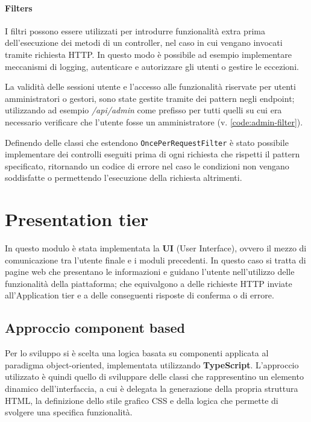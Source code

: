 

\paragraph{Filters}
I filtri possono essere utilizzati per introdurre funzionalità extra prima
dell’esecuzione dei metodi di un controller, nel caso in cui vengano invocati
tramite richiesta HTTP. In questo modo è possibile ad esempio implementare
meccanismi di logging, autenticare e autorizzare gli utenti o gestire le eccezioni. 

La validità delle sessioni utente e l'accesso alle funzionalità riservate per
utenti amministratori o gestori, sono state gestite tramite dei pattern negli
endpoint; utilizzando ad esempio \textit{/api/admin} come prefisso per tutti
quelli su cui era necessario verificare che l'utente fosse un amministratore
(v. \ref{code:admin-filter}).

Definendo delle classi che estendono \texttt{OncePerRequestFilter} è stato
possibile implementare dei controlli eseguiti prima di ogni richiesta che rispetti
il pattern specificato, ritornando un codice di errore nel caso le condizioni
non vengano soddisfatte o permettendo l'esecuzione della richiesta altrimenti.





\section{Presentation tier}

In questo modulo è stata implementata la \textbf{UI} (User Interface), ovvero il
mezzo di comunicazione tra l'utente finale e i moduli precedenti. In questo caso
si tratta di pagine web che presentano le informazioni e guidano l'utente nell'utilizzo
delle funzionalità della piattaforma; che equivalgono a delle richieste HTTP
inviate all'Application tier e a delle conseguenti risposte di conferma o di errore.


\subsection{Approccio component based}
Per lo sviluppo si è scelta una logica basata su componenti applicata al
paradigma object-oriented, implementata utilizzando \textbf{TypeScript}.
L'approccio utilizzato è quindi quello di sviluppare delle classi che rappresentino
un elemento dinamico dell'interfaccia, a cui è delegata la generazione della propria
struttura HTML, la definizione dello stile grafico CSS e della logica che permette
di svolgere una specifica funzionalità.

